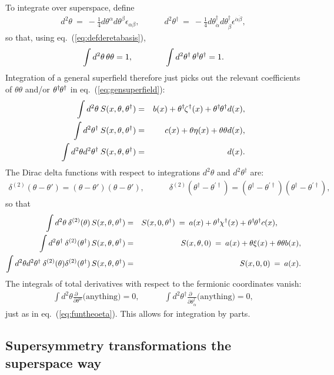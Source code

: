 \documentclass[11pt]{article}
\newcommand{\thdthd}{\theta^\dagger\hspace{-1pt}\theta^\dagger}
\def\beq{\begin{eqnarray}}
\def\eeq{\end{eqnarray}}
\begin{document}
To integrate over superspace, define
\beq
d^2\theta  
\>=\> -\frac{1}{4} d\theta^\alpha d \theta^\beta \epsilon_{\alpha\beta}
,
\qquad\quad
d^2\theta^\dagger \>=\> -\frac{1}{4} d\theta^\dagger_{\dot\alpha} 
d \theta^\dagger_{\dot\beta} 
\epsilon^{\dot\alpha\dot\beta}
,
\eeq
so that, using eq.~(\ref{eq:defderetabasis}),
\beq
\int d^2\theta \,\theta\theta = 1,\qquad\qquad
\int d^2\theta^\dagger \,\thdthd = 1.
\eeq
Integration of a general superfield therefore just picks out the 
relevant coefficients of $\theta\theta$ and/or 
$\thdthd$
in eq.~(\ref{eq:gensuperfield}):
\beq
\int d^2\theta\> S(x, \theta, \theta^\dagger) &=& 
b(x) 
+ \theta^\dagger\hspace{-1pt} \zeta^\dagger (x)
+ \thdthd d(x) ,
\\
\int d^2\theta^\dagger \> S(x, \theta, \theta^\dagger) &=& 
c(x) 
+ \theta \eta(x) 
+ \theta \theta d(x) ,
\\
\int d^2\theta d^2 \theta^\dagger \> S(x, \theta, \theta^\dagger) &=& d(x) .
\label{eq:heckuvajobtimmy}
\eeq
The Dirac delta functions with respect to integrations
$d^2\theta$ and $d^2\theta^\dagger$ are:
\beq
\delta^{(2)} (\theta - \theta') = (\theta - \theta')(\theta - \theta'),
\qquad\quad
\delta^{(2)} (\theta^\dagger - \theta^{\prime\dagger}) = 
(\theta^\dagger - \theta^{\prime\dagger})
(\theta^\dagger - \theta^{\prime\dagger}) ,
\label{eq:deltathetatheta}
\eeq
so that
\beq
\int d^2\theta \> \delta^{(2)}(\theta) \, S(x,\theta,\theta^\dagger) 
&=& S(x,0,\theta^\dagger) 
\>=\> 
a(x) + \theta^\dagger\hspace{-1pt} \chi^\dagger (x) + 
\thdthd c(x) ,
\phantom{xxxxx}
\\
\int d^2\theta^\dagger \> \delta^{(2)}(\theta^\dagger) \, 
S(x,\theta,\theta^\dagger) 
&=& 
S(x,\theta,0) 
\> = \>
a(x) + \theta \xi(x) + \theta\theta b(x) ,
\\
\int d^2\theta d^2\theta^\dagger \> 
\delta^{(2)}(\theta)\delta^{(2)}(\theta^\dagger) \, 
S(x,\theta,\theta^\dagger) 
&=& 
S(x,0,0) 
\>=\>
a(x).
\eeq
The integrals of total derivatives with respect to the fermionic 
coordinates vanish:
\beq
\int d^2\theta 
\frac{\partial\phantom{x}}{\partial\theta^{\alpha}} \mbox{(anything)} = 0
,
\qquad\quad
\int d^2\theta^\dagger 
\frac{\partial\phantom{x}}{\partial\theta^\dagger_{\dot\alpha}} 
\mbox{(anything)} = 0,
\label{eq:totalthetaderivsvanish}
\eeq
just as in eq.~(\ref{eq:funtheoeta}). This allows for integration by parts.


\subsection{Supersymmetry transformations the superspace 
way\label{subsec:superspacetransformations}}
\setcounter{footnote}{2}
\setcounter{equation}{0}
\end{document}
